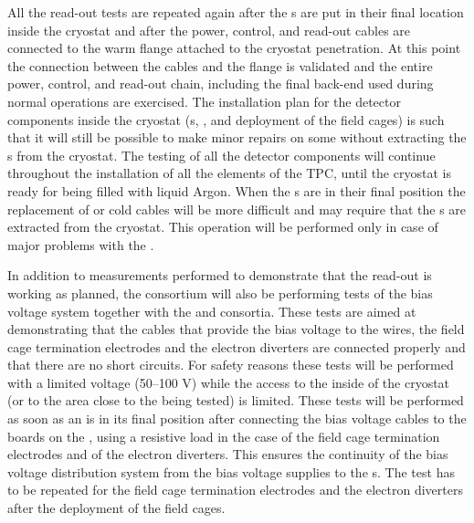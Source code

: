 All the read-out tests are repeated again after the s are put
in their final location inside the cryostat and after the power, control, and
read-out cables are connected to the warm flange attached to the cryostat
penetration. At this point the connection between the cables and the flange
is validated and the entire power, control, and read-out chain, including the
final  back-end used during normal operations are exercised. The
installation plan for the detector components inside the cryostat (s,
, and deployment of the field cages) is such that it will still
be possible to make minor repairs on some  without extracting
the s from the cryostat. The testing of all the detector components
will continue throughout the installation of all the elements of the TPC, 
until the cryostat is ready for being filled with liquid Argon.  When the 
s are in their final position the replacement of  
or cold cables will be more difficult and may require that the s 
are extracted from the cryostat. This operation will be performed only in 
case of major problems with the .

In addition to measurements performed to demonstrate that the 
read-out is working as planned, the  consortium will also
be performing tests of the bias voltage system together with the 
and  consortia. These tests are aimed at demonstrating that
the cables that provide the bias voltage to the  wires, the
field cage termination electrodes and the electron diverters are connected
properly and that there are no short circuits. For safety reasons these
tests will be performed with a limited voltage (50--100 V) while the access
to the inside of the cryostat (or to the area close to the  being
tested) is limited. These tests will be performed as soon as an 
is in its final position after connecting the bias voltage cables to the 
 boards on the , using a resistive load in the case of the 
field cage termination electrodes and of the electron diverters. This ensures
the continuity of the bias voltage distribution system from the bias voltage
supplies to the s. The test has to be repeated for the field cage
termination electrodes and the electron diverters after the deployment of
the field cages.

